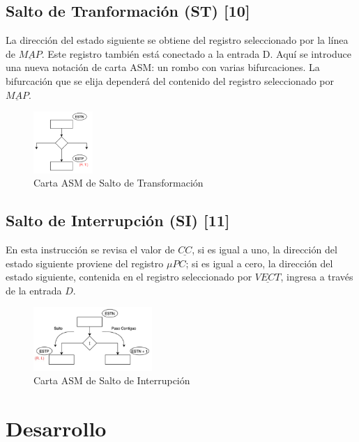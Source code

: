 \documentclass[table]{scrartcl}
\begin{document}
\subsection{Salto de Tranformación (ST) [10]}\label{sec:salto-de-tranf}
La dirección del estado siguiente se obtiene del registro seleccionado por la línea de $\underline{MAP}$.
Este registro también está conectado a la entrada D. Aquí se introduce una nueva notación
de carta ASM: un rombo con varias bifurcaciones. La bifurcación que se elija dependerá del
contenido del registro seleccionado por $\underline{MAP}$.
\begin{figure}[H]
  \centering
  \includegraphics[width=0.2\textwidth]{./img/st}
  \caption{Carta ASM de Salto de Transformación}\label{fig:st}
\end{figure}

\subsection{Salto de Interrupción (SI) [11]}\label{sec:salto-de-interr}
En esta instrucción se revisa el valor de $\underline{CC}$, si es igual a uno, la dirección del estado siguiente
proviene del registro $\mu{}PC$; si es igual a cero, la dirección del estado siguiente, contenida en
el registro seleccionado por $\underline{VECT}$, ingresa a través de la entrada $D$.
\begin{figure}[H]
  \centering
  \includegraphics[width=0.4\textwidth]{./img/si}
  \caption{Carta ASM de Salto de Interrupción}\label{fig:si}
\end{figure}




\newpage{}
\section{Desarrollo}
\label{sec:desarrollo}
\end{document}
